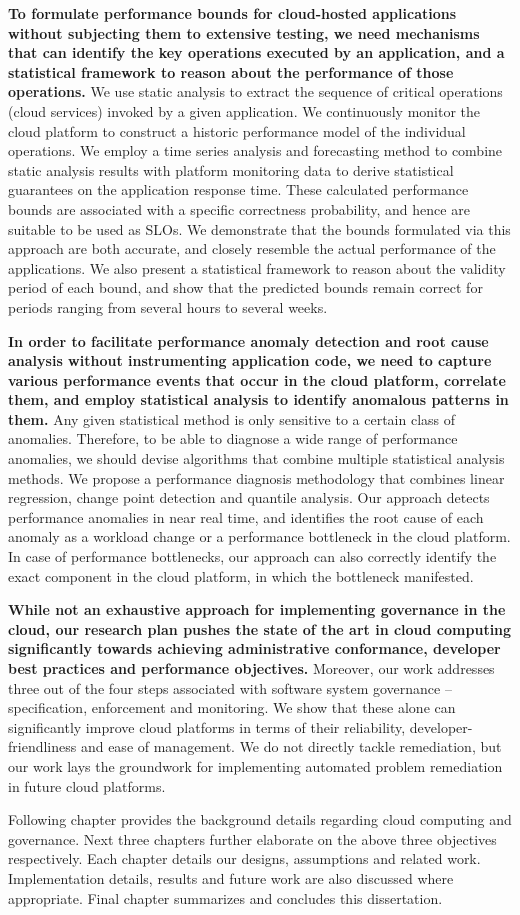 \textbf{To formulate performance bounds for cloud-hosted applications without subjecting them to extensive testing,
we need mechanisms that can identify the key operations executed by an application, and a
statistical framework to reason about the performance of those operations.} We use static
analysis to extract the sequence of critical operations (cloud services) invoked by a given application.
We continuously monitor the cloud platform to construct a historic performance model of the individual operations.
We employ a time series analysis and forecasting method to combine static analysis results with
platform monitoring data to
derive statistical guarantees on the application response time. These calculated performance
bounds are associated with a specific correctness probability, and hence are suitable to be used
as SLOs. We demonstrate that the bounds formulated via this approach are 
both accurate, and closely resemble the actual performance of the applications. We also present a statistical framework
to reason about the validity period of each bound, and show that the predicted bounds
remain correct for periods ranging from several hours to several weeks.

\textbf{In order to facilitate performance anomaly detection and root cause analysis without instrumenting
application code, we need to capture various performance events that occur in the cloud platform,
correlate them, and employ statistical analysis to identify anomalous patterns in them.} Any given statistical
method is only sensitive to a certain class of anomalies. Therefore, to be able to diagnose a wide range of
performance anomalies, we should devise algorithms that combine multiple statistical analysis
methods. We propose a performance diagnosis methodology that combines linear regression, change point
detection and quantile analysis. Our approach detects performance anomalies in near real time,
and identifies the root cause of each anomaly as a workload change or a performance bottleneck
in the cloud platform. In case of performance bottlenecks, our approach can also correctly identify
the exact component in the cloud platform, in which the bottleneck manifested.

\textbf{While not an exhaustive approach for implementing governance in the cloud, our research plan
pushes the state of the art in cloud computing significantly towards achieving
administrative conformance, developer best practices and performance objectives.} Moreover,
our work addresses three out of the four steps associated with software system governance --
specification, enforcement and monitoring. We show that these alone can significantly improve cloud platforms
in terms of their reliability, developer-friendliness and ease of management. 
We do not directly tackle remediation, but our work
lays the groundwork for implementing automated problem remediation in future cloud platforms.

Following chapter provides the background details regarding cloud computing and governance.
Next three chapters further elaborate on the above three objectives respectively. 
Each chapter details our designs, assumptions and related work. Implementation details,
results and future work are also discussed where appropriate. Final chapter
summarizes and concludes this dissertation.
